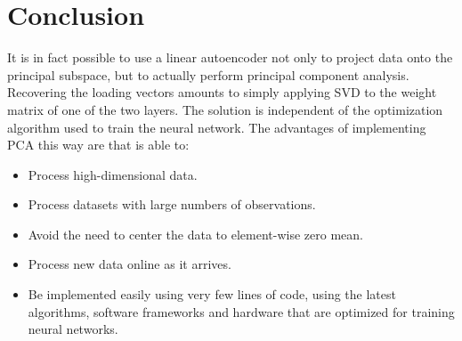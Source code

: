 \documentclass[journal]{IEEEtran}
\begin{document}
\section{Conclusion}
It is in fact possible to use a linear autoencoder not only to project data onto the principal subspace, but to actually perform principal component analysis. Recovering the loading vectors amounts to simply applying SVD to the weight matrix of one of the two layers. The solution is independent of the optimization algorithm used to train the neural network. The advantages of implementing PCA this way are that is able to:
\begin{itemize}
\item Process high-dimensional data.
\item Process datasets with large numbers of observations.
\item Avoid the need to center the data to element-wise zero mean.
\item Process new data online as it arrives.
\item Be implemented easily using very few lines of code, using the latest algorithms, software frameworks and hardware that are optimized for training neural networks.
\end{itemize}


%
\end{document}
